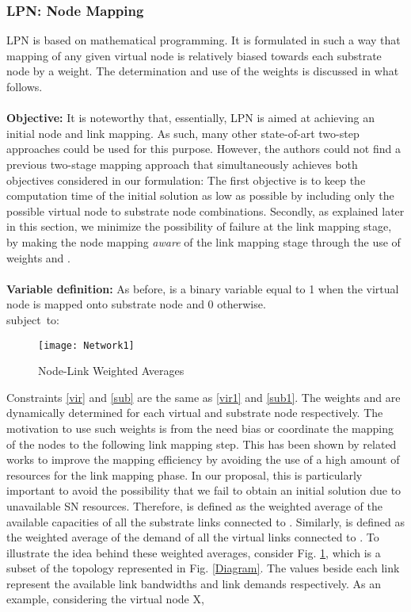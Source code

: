 \documentclass[journal]{IEEEtran}
\def\ST{{\rm subject\ to}}
\begin{document}
\subsubsection*{LPN: Node Mapping}
LPN is based on mathematical programming. It is formulated in such a way that mapping of any given virtual node is relatively biased towards each substrate node by a weight. The determination and use of the weights is discussed in what follows.\\\\
\textbf{Objective:} 
It is noteworthy that, essentially, LPN is aimed at achieving an initial node and link mapping. As such, many other state-of-art two-step approaches \cite{Fischer13} could be used for this purpose. However, the authors could not find a previous two-stage mapping approach that simultaneously achieves  both objectives considered in our formulation: The first objective is to keep the computation time of the initial solution as low as possible by including only the possible virtual node to substrate node combinations. Secondly, as explained later in this section, we minimize the possibility of failure at the link mapping stage, by making the node mapping \emph{aware} of the link mapping stage through the use of weights  and .\\\\
\textbf{Variable definition:} As before,  is a binary variable equal to 1 when the virtual node  is mapped onto substrate node  and 0 otherwise.\\


\ST:




\begin{figure}
  {\texttt{[image: Network1]}}
  \caption{Node-Link Weighted Averages}\label{Diagram1}
\end{figure}
Constraints \eqref{vir} and \eqref{sub} are the same as \eqref{vir1} and \eqref{sub1}. The weights  and  are dynamically determined for each virtual and substrate node respectively. The motivation to use such weights is from the need bias or coordinate the mapping of the nodes to the following link mapping step. This has been shown by related works to improve the mapping efficiency \cite{Chowdhury12} by avoiding the use of a high amount of resources for the link mapping phase. In our proposal, this is particularly important to avoid the possibility that we fail to obtain an initial solution due to unavailable \ac{SN} resources. Therefore,  is defined as the weighted average of the available capacities of all the substrate links connected to . Similarly,  is defined as the weighted average of the demand of all the virtual links connected to . To illustrate the idea behind these weighted averages, consider Fig. \ref{Diagram1}, which is a subset of the topology represented in Fig. \ref{Diagram}. The values beside each link represent the available link bandwidths and link demands respectively. As an example, considering the virtual node X,
\begingroup
\fontsize{9pt}{9pt}
\end{document}
